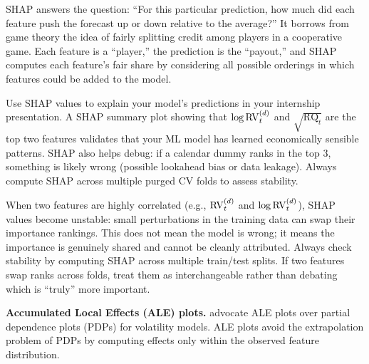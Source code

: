 \begin{intuition}
SHAP answers the question: ``For this particular prediction, how much did each feature push the forecast up or down relative to the average?'' It borrows from game theory the idea of fairly splitting credit among players in a cooperative game. Each feature is a ``player,'' the prediction is the ``payout,'' and SHAP computes each feature's fair share by considering all possible orderings in which features could be added to the model.
\end{intuition}

\begin{projectconnection}
Use SHAP values to explain your model's predictions in your internship presentation. A SHAP summary plot showing that $\log \operatorname{RV}_t^{(d)}$ and $\sqrt{\operatorname{RQ}_t}$ are the top two features validates that your ML model has learned economically sensible patterns. SHAP also helps debug: if a calendar dummy ranks in the top 3, something is likely wrong (possible lookahead bias or data leakage). Always compute SHAP across multiple purged CV folds to assess stability.
\end{projectconnection}

\begin{warning}
When two features are highly correlated (e.g., $\operatorname{RV}_t^{(d)}$ and $\log \operatorname{RV}_t^{(d)}$), SHAP values become unstable: small perturbations in the training data can swap their importance rankings.
This does not mean the model is wrong; it means the importance is genuinely shared and cannot be cleanly attributed.
Always check stability by computing SHAP across multiple train/test splits.
If two features swap ranks across folds, treat them as interchangeable rather than debating which is ``truly'' more important.
\end{warning}

\textbf{Accumulated Local Effects (ALE) plots.}
\citet{ChristensenSiggaardVeliyev2023} advocate ALE plots over partial dependence plots (PDPs) for volatility models.
ALE plots avoid the extrapolation problem of PDPs by computing effects only within the observed feature distribution.

